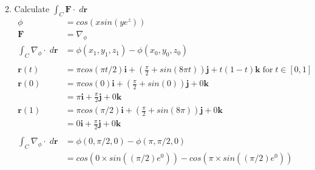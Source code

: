 \documentclass[11pt]{article}
\begin{document}
\begin{preview}
\begin{enumerate}
\begin{enumerate}
\begin{align*}
                  \end{align*}
            \item Calculate $\int_C \textbf{F} \cdot \; d \textbf{r}$
                  \begin{align*}
                    \phi                                       & = cos(xsin(ye^{z}))                                                                                                                  \\
                    \textbf{F}                                 & = \nabla_{\phi}                                                                                                                      \\
                    \int_C \nabla_{\phi} \cdot \; d \textbf{r} & =\phi(x_1,y_1,z_1) - \phi(x_0,y_0,z_0)                                                                                               \\\\
                    \textbf{r}(t)                              & = \pi cos(\pi t/2)\textbf{i} + \left( \frac{\pi}{2} + sin(8\pi t)\right)\textbf{j} + t(1-t)\textbf{k} \; \mathrm{for} \; t \in [0,1] \\
                    \textbf{r}(0)                              & = \pi cos(0)\textbf{i} + \left( \frac{\pi}{2} + sin(0)\right)\textbf{j} + 0\textbf{k}                                                \\
                                                               & =                                          \pi\textbf{i} + \frac{\pi}{2} \textbf{j} + 0 \textbf{k}                                   \\
                    \textbf{r}(1)                              & = \pi cos(\pi/2)\textbf{i} + \left( \frac{\pi}{2} + sin(8\pi)\right)\textbf{j} + 0\textbf{k}                                         \\
                                                               & =                                           0\textbf{i} +  \frac{\pi}{2}\textbf{j} +  0\textbf{k}                                    \\\\
                    \int_C \nabla_{\phi} \cdot \; d \textbf{r} & =\phi(0,\pi/2,0) - \phi(\pi,\pi/2,0)                                                                                                 \\
                                                               & = cos(0{\times}sin((\pi/2)e^{0}))  - cos(\pi{\times}sin((\pi/2)e^{0}))                                                               \\

\end{align*}
\end{enumerate}
\end{enumerate}
\end{preview}
\end{document}
